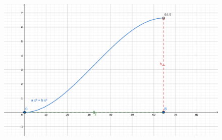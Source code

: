 \begin{figure}[!hbt]
    \centering
    \includegraphics[height = 0.4\textheight]{recursos/geogebra-export-piloto.png}
\end{figure}